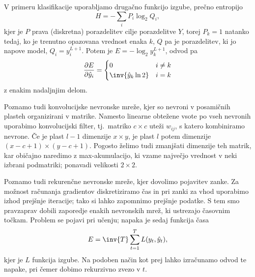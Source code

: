 
V primeru klasifikacije uporabljamo drugačno funkcijo izgube, prečno entropijo
\[
  H = - \sum_i P_i \log_2 Q_i,
\]
kjer je $P$ prava (diskretna) porazdelitev cilje porazdelitve $Y$, torej $P_k =
1$ natanko tedaj, ko je trenutno opazovana vrednost enaka $k$, $Q$ pa je
porazdelitev, ki jo napove model, $Q_i = y_i^{L+1}$.
Potem je $E = - \log_2 y_k^{L+1}$, odvod pa
\[
  \frac{\partial E}{\partial \hat{y}_i}
  =
  \begin{cases}
	0 & i \ne k \\
	\inv{\hat{y}_k \ln 2} & i = k
  \end{cases}
\]
z enakim nadaljnjim delom.


Poznamo tudi konvolucijske nevronske mreže, kjer so nevroni v posamičnih plasteh
organizirani v matrike.
Namesto linearne obtežene vsote po vseh nevronih uporabimo konvolucijski filter,
tj.~matriko $c \times c$ uteži $w_{ij}$, s katero kombiniramo nevrone.
Če je plast $l-1$ dimenzije $x \times y$, je plast $l$ potem dimenzije $(x-c+1)
\times (y - c+1)$.
Pogosto želimo tudi zmanjšati dimenzije teh matrik, kar običajno naredimo z
max-akumulacijo, ki vzame največjo vrednost v neki izbrani podmatriki; ponavadi
velikosti $2 \times 2$.


Poznamo tudi rekurenčne nevronske mreže, kjer dovolimo pojavitev zanke.
Za možnost računanja gradientov diskretiziramo čas in pri zanki za vhod
uporabimo izhod prejšnje iteracije; tako si lahko zapomnimo prejšnje podatke.
S tem smo pravzaprav dobili zaporedje enakih nevronskih mrež, ki ustrezajo
časovnim točkam.
Problem se pojavi pri učenju; napaka je sedaj funkcija časa
\[
  E = \inv{T} \sum_{t=1}^T L(y_t, \hat{y}_t),
\]
kjer je $L$ funkcija izgube.
Na podoben način kot prej lahko izračunamo odvod te napake, pri čemer dobimo
rekurzivno zvezo v $t$.


